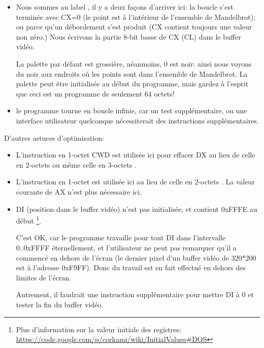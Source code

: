 \begin{itemize}
\begin{itemize}
    \end{itemize}

\item Nous sommes au label , il y a deux façons d'arriver ici:
la boucle s'est terminée avec CX=0 (le point est à l'intérieur de l'ensemble de Mandelbrot);
ou parce qu'un débordement s'est produit (CX contient toujours une valeur non zéro.)
Nous écrivons la partie 8-bit basse de CX (CL) dans le buffer vidéo.

La palette par défaut est grossière, néanmoins, 0 est noir: ainsi nous voyons du noir
aux endroits où les points sont dans l'ensemble de Mandelbrot.
La palette peut être initialisée au début du programme, mais gardez à l'esprit que
ceci est un programme de seulement 64 octets!

\item le programme tourne en boucle infinie, car un test supplémentaire, ou une interface
utilisateur quelconque nécessiterait des instructions supplémentaires.

\end{itemize}

D'autres astuces d'optimisation:

\begin{itemize}
\item L'instruction en 1-octet CWD est utilisée ici
pour effacer DX au lieu de celle en 2-octets  ou même celle en 3-octets .

\item L'instruction en 1-octet  est utilisée ici au lieu de celle en 2-octets
. 
La valeur courante de AX n'est plus nécessaire ici.

\item DI (position dans le buffer vidéo) n'est pas initialisée, et contient 0xFFFE au début
\footnote{Plus d'information sur la valeur initiale des registres:
\url{https://code.google.com/p/corkami/wiki/InitialValues#DOS}}.

C'est OK, car le programme travaille pour tout DI dans l'intervalle 0..0xFFFF éternellement,
et l'utilisateur ne peut pas remarquer qu'il a commencé en dehors de l'écran (le
dernier pixel d'un buffer vidéo de 320*200 est à l'adresse 0xF9FF).
Donc du travail est en fait effectué en dehors des limites de l'écran.

Autrement, il faudrait une instruction supplémentaire pour mettre DI à 0 et tester
la fin du buffer vidéo.

\end{itemize}

